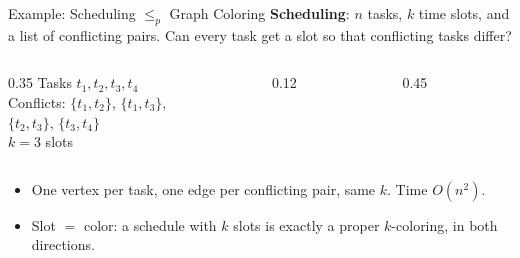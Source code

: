 \documentclass[10pt,aspectratio=169]{beamer}
\begin{document}
\begin{frame}{Example: Scheduling $\le_p$ Graph Coloring}
  \textbf{Scheduling}: $n$ tasks, $k$ time slots, and a list of conflicting
  pairs. Can every task get a slot so that conflicting tasks differ?

  \begin{columns}[c]
    \begin{column}{0.35\textwidth}
      \small
      Tasks $t_1, t_2, t_3, t_4$\\[2pt]
      Conflicts: $\{t_1, t_2\}$, $\{t_1, t_3\}$,\\
      \hphantom{Conflicts: }$\{t_2, t_3\}$, $\{t_3, t_4\}$\\[2pt]
      $k = 3$ slots
    \end{column}
    \begin{column}{0.12\textwidth}
      \begin{center}
      \end{center}
    \end{column}
    \begin{column}{0.45\textwidth}
      \begin{center}
      \end{center}
    \end{column}
  \end{columns}

  \medskip
  \begin{itemize}
    \item One vertex per task, one edge per conflicting pair, same $k$.
          Time $O(n^2)$.
    \item<2-> Slot $=$ color: a schedule with $k$ slots is exactly a proper
          $k$-coloring, in both directions.
  \end{itemize}
\end{frame}
\end{document}
